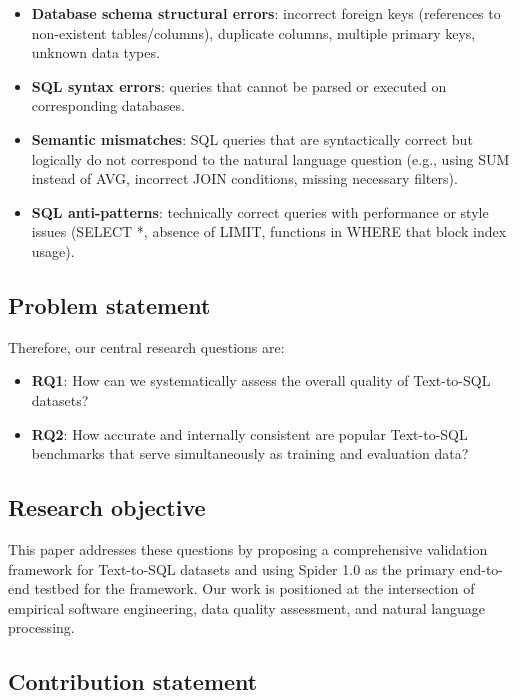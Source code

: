 \documentclass[]{einformatica}
\begin{document}
\begin{itemize}
\item \textbf{Database schema structural errors}: incorrect foreign keys (references to non-existent tables/columns), duplicate columns, multiple primary keys, unknown data types.
\item \textbf{SQL syntax errors}: queries that cannot be parsed or executed on corresponding databases.
\item \textbf{Semantic mismatches}: SQL queries that are syntactically correct but logically do not correspond to the natural language question (e.g., using SUM instead of AVG, incorrect JOIN conditions, missing necessary filters).
\item \textbf{SQL anti-patterns}: technically correct queries with performance or style issues (SELECT *, absence of LIMIT, functions in WHERE that block index usage).
\end{itemize}

\subsection*{Problem statement}

Therefore, our central research questions are:

\begin{itemize}
\item \textbf{RQ1}: How can we systematically assess the overall quality of Text-to-SQL datasets?
\item \textbf{RQ2}: How accurate and internally consistent are popular Text-to-SQL benchmarks that serve simultaneously as training and evaluation data?
\end{itemize}

\subsection*{Research objective}

This paper addresses these questions by proposing a comprehensive validation framework for Text-to-SQL datasets and using Spider 1.0 as the primary end-to-end testbed for the framework. Our work is positioned at the intersection of empirical software engineering, data quality assessment, and natural language processing.

\subsection*{Contribution statement}
\end{document}
